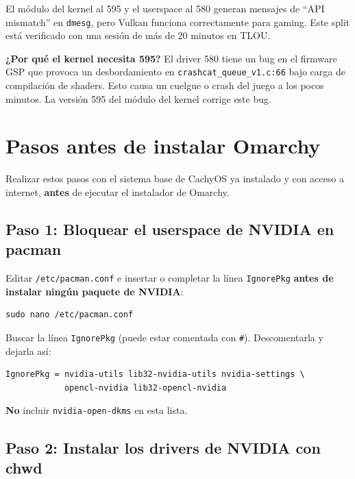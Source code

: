 \documentclass[12pt,a4paper]{article}
\begin{document}
El módulo del kernel al 595 y el userspace al 580 generan mensajes de
``API mismatch'' en \texttt{dmesg}, pero Vulkan funciona correctamente para
gaming. Este split está verificado con una sesión de más de 20 minutos en TLOU.

\begin{nota}
\textbf{¿Por qué el kernel necesita 595?}
El driver 580 tiene un bug en el firmware GSP que provoca un desbordamiento
en \texttt{crashcat\_queue\_v1.c:66} bajo carga de compilación de shaders.
Esto causa un cuelgue o crash del juego a los pocos minutos. La versión 595
del módulo del kernel corrige este bug.
\end{nota}

\section{Pasos antes de instalar Omarchy}

Realizar estos pasos con el sistema base de CachyOS ya instalado y con
acceso a internet, \textbf{antes} de ejecutar el instalador de Omarchy.

\subsection{Paso 1: Bloquear el userspace de NVIDIA en pacman}

Editar \texttt{/etc/pacman.conf} e insertar o completar la línea
\texttt{IgnorePkg} \textbf{antes de instalar ningún paquete de NVIDIA}:

\begin{lstlisting}[style=bash]
sudo nano /etc/pacman.conf
\end{lstlisting}

Buscar la línea \texttt{IgnorePkg} (puede estar comentada con \texttt{\#}).
Descomentarla y dejarla así:

\begin{lstlisting}[style=bash]
IgnorePkg = nvidia-utils lib32-nvidia-utils nvidia-settings \
            opencl-nvidia lib32-opencl-nvidia
\end{lstlisting}

\textbf{No} incluir \texttt{nvidia-open-dkms} en esta lista.

\subsection{Paso 2: Instalar los drivers de NVIDIA con chwd}
\end{document}
